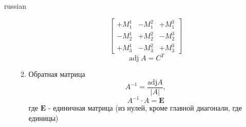 \documentclass{article}
\begin{document}
\begin{otherlanguage*}{russian}
\begin{enumerate}
\begin{enumerate}
\begin{equation}
\begin{bmatrix}
+ M^1_1 & - M^2_1 & + M^3_1 \\
- M^1_2 & + M^2_2 & - M^3_2 \\
+ M^1_3 & - M^2_3 & + M^3_3
\end{bmatrix}
\end{equation}
\begin{equation}
\operatorname{adj} A = C^T
\end{equation}
\item Обратная матрица
\begin{equation}
{\displaystyle A^{-1}={\frac {{\mbox{adj}}A}{|A|}},}
\end{equation}
\begin{equation}
A^{-1} \cdot A = \mathbf{E}
\end{equation}
где $\mathbf{E}$ - единичная матрица (из нулей, кроме главной диагонали, где единицы) 
\end{enumerate}

\end{enumerate}
\end{otherlanguage*}
\end{document}
